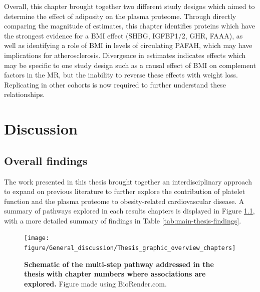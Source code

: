 \documentclass[11pt,twoside]{bristolthesis}
\begin{document}
Overall, this chapter brought together two different study designs which aimed to determine the effect of adiposity on the plasma proteome. Through directly comparing the magnitude of estimates, this chapter identifies proteins which have the strongest evidence for a BMI effect (SHBG, IGFBP1/2, GHR, FAAA), as well as identifying a role of BMI in levels of circulating PAFAH, which may have implications for atherosclerosis. Divergence in estimates indicates effects which may be specific to one study design such as a causal effect of BMI on complement factors in the MR, but the inability to reverse these effects with weight loss. Replicating in other cohorts is now required to further understand these relationships.

\hypertarget{discussion-6}{%
\chapter{Discussion}\label{discussion-6}}

\hypertarget{overall-findings}{%
\section{Overall findings}\label{overall-findings}}

The work presented in this thesis brought together an interdisciplinary approach to expand on previous literature to further explore the contribution of platelet function and the plasma proteome to obesity-related cardiovascular disease. A summary of pathways explored in each results chapters is displayed in Figure \ref{fig:Thesis-schematic-chaps}, with a more detailed summary of findings in Table \ref{tab:main-thesis-findings}.



\begin{figure}
\texttt{[image: figure/General\_discussion/Thesis\_graphic\_overview\_chapters]} \caption[Schematic of the multi-step pathway addressed in the thesis with chapter numbers where associations are explored]{\textbf{Schematic of the multi-step pathway addressed in the thesis with chapter numbers where associations are explored.} Figure made using BioRender.com.}\label{fig:Thesis-schematic-chaps}
\end{figure}
\end{document}
